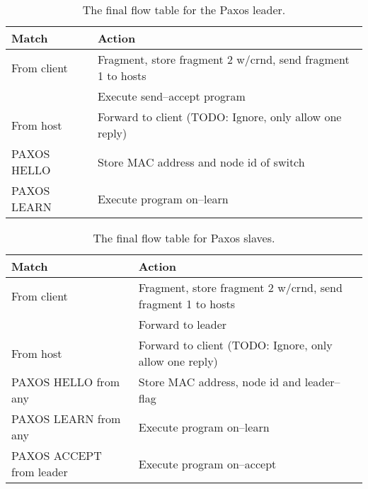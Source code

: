 \begin{table}[H]
  \begin{tabular}{|l|l|}
    \hline \textbf{Match} & \textbf{Action} \\
    \hline From client & Fragment, store fragment 2 w/crnd, send fragment 1 to hosts \\
                       & Execute send--accept program \\
    \hline From host & Forward to client (TODO: Ignore, only allow one reply) \\
    \hline PAXOS HELLO & Store MAC address and node id of switch \\
    \hline PAXOS LEARN & Execute program on--learn \\
    \hline
  \end{tabular}
  \caption{The final flow table for the Paxos leader.}
  \label{table:complete.match.leader}
\end{table}

\begin{table}[H]
  \begin{tabular}{|l|l|}
    \hline \textbf{Match} & \textbf{Action} \\
    \hline From client & Fragment, store fragment 2 w/crnd, send fragment 1 to hosts \\
                       & Forward to leader \\
    \hline From host & Forward to client (TODO: Ignore, only allow one reply) \\
    \hline PAXOS HELLO from any & Store MAC address, node id and leader--flag \\
    \hline PAXOS LEARN from any & Execute program on--learn \\
    \hline PAXOS ACCEPT from leader & Execute program on--accept \\
    \hline
  \end{tabular}
  \caption{The final flow table for Paxos slaves.}
  \label{table:complete.match.slave}
\end{table}
